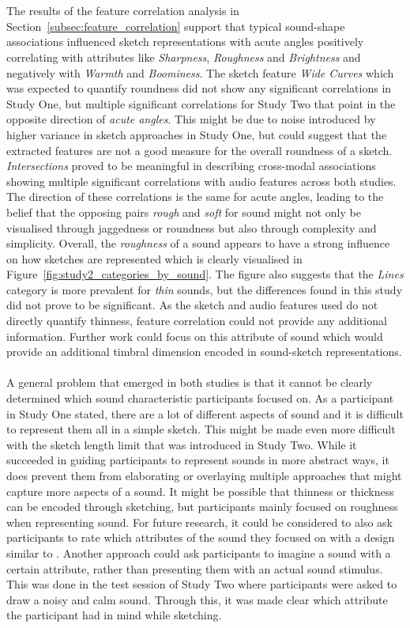 \documentclass[]{interact}
\theoremstyle{plain}%
\theoremstyle{definition}
\theoremstyle{remark}
\begin{document}
\\ \\
The results of the feature correlation analysis in Section~\ref{subsec:feature_correlation} support that typical sound-shape associations influenced sketch representations with acute angles positively correlating with attributes like \textit{Sharpness}, \textit{Roughness} and \textit{Brightness} and negatively with \textit{Warmth} and \textit{Boominess}. The sketch feature \textit{Wide Curves} which was expected to quantify roundness did not show any significant correlations in Study One, but multiple significant correlations for Study Two that point in the opposite direction of \textit{acute angles}. This might be due to noise introduced by higher variance in sketch approaches in Study One, but could suggest that the extracted features are not a good measure for the overall roundness of a sketch. \textit{Intersections} proved to be meaningful in describing cross-modal associations showing multiple significant correlations with audio features across both studies. The direction of these correlations is the same for acute angles, leading to the belief that the opposing pairs \textit{rough} and \textit{soft} for sound might not only be visualised through jaggedness or roundness but also through complexity and simplicity. Overall, the \textit{roughness} of a sound appears to have a strong influence on how sketches are represented which is clearly visualised in Figure~\ref{fig:study2_categories_by_sound}. The figure also suggests that the \textit{Lines} category is more prevalent for \textit{thin} sounds, but the differences found in this study did not prove to be significant. As the sketch and audio features used do not directly quantify thinness, feature correlation could not provide any additional information. Further work could focus on this attribute of sound which would provide an additional timbral dimension encoded in sound-sketch representations. 
\\ \\ 
A general problem that emerged in both studies is that it cannot be clearly determined which sound characteristic participants focused on. As a participant in Study One stated, there are a lot of different aspects of sound and it is difficult to represent them all in a simple sketch. This might be made even more difficult with the sketch length limit that was introduced in Study Two. While it succeeded in guiding participants to represent sounds in more abstract ways, it does prevent them from elaborating or overlaying multiple approaches that might capture more aspects of a sound. It might be possible that thinness or thickness can be encoded through sketching, but participants mainly focused on roughness when representing sound. For future research, it could be considered to also ask participants to rate which attributes of the sound they focused on with a design similar to . Another approach could ask participants to imagine a sound with a certain attribute, rather than presenting them with an actual sound stimulus. This was done in the test session of Study Two where participants were asked to draw a noisy and calm sound. Through this, it was made clear which attribute the participant had in mind while sketching. 
\end{document}
